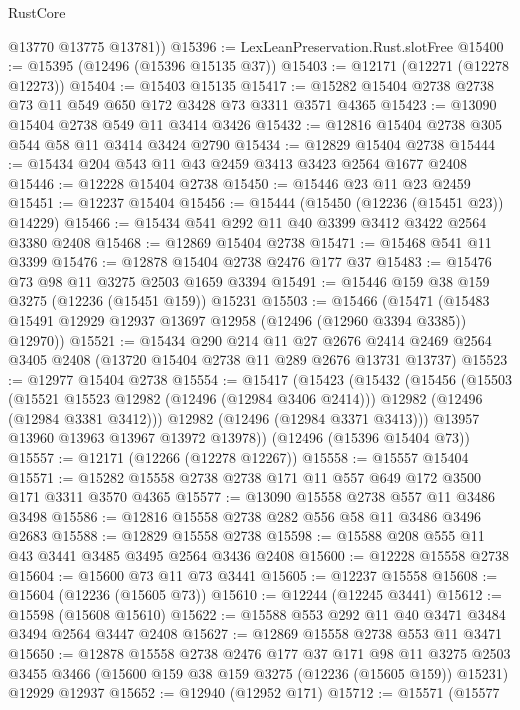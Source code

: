 \begin{lexlean}{RustCore}
\begin{coremodule}
        @13770
        @13775
        @13781))
@15396 := LexLeanPreservation.Rust.slotFree
@15400 := @15395 (@12496 (@15396 @15135 @37))
@15403 := @12171 (@12271 (@12278 @12273))
@15404 := @15403 @15135
@15417 := @15282 @15404 @2738 @2738 @73 @11 @549 @650 @172 @3428 @73 @3311 @3571 @4365
@15423 := @13090 @15404 @2738 @549 @11 @3414 @3426
@15432 := @12816 @15404 @2738 @305 @544 @58 @11 @3414 @3424 @2790
@15434 := @12829 @15404 @2738
@15444 := @15434 @204 @543 @11 @43 @2459 @3413 @3423 @2564 @1677 @2408
@15446 := @12228 @15404 @2738
@15450 := @15446 @23 @11 @23 @2459
@15451 := @12237 @15404
@15456 := @15444 (@15450 (@12236 (@15451 @23)) @14229)
@15466 := @15434 @541 @292 @11 @40 @3399 @3412 @3422 @2564 @3380 @2408
@15468 := @12869 @15404 @2738
@15471 := @15468 @541 @11 @3399
@15476 := @12878 @15404 @2738 @2476 @177 @37
@15483 := @15476 @73 @98 @11 @3275 @2503 @1659 @3394
@15491 := @15446 @159 @38 @159 @3275 (@12236 (@15451 @159)) @15231
@15503 := @15466
    (@15471 (@15483 @15491 @12929 @12937 @13697 @12958 (@12496 (@12960 @3394 @3385)) @12970))
@15521 := @15434
    @290
    @214
    @11
    @27
    @2676
    @2414
    @2469
    @2564
    @3405
    @2408
    (@13720 @15404 @2738 @11 @289 @2676 @13731 @13737)
@15523 := @12977 @15404 @2738
@15554 := @15417
    (@15423
      (@15432
        (@15456
          (@15503
            (@15521 @15523 @12982 (@12496 (@12984 @3406 @2414)))
            @12982
            (@12496 (@12984 @3381 @3412)))
          @12982
          (@12496 (@12984 @3371 @3413)))
        @13957
        @13960
        @13963
        @13967
        @13972
        @13978))
    (@12496 (@15396 @15404 @73))
@15557 := @12171 (@12266 (@12278 @12267))
@15558 := @15557 @15404
@15571 := @15282 @15558 @2738 @2738 @171 @11 @557 @649 @172 @3500 @171 @3311 @3570 @4365
@15577 := @13090 @15558 @2738 @557 @11 @3486 @3498
@15586 := @12816 @15558 @2738 @282 @556 @58 @11 @3486 @3496 @2683
@15588 := @12829 @15558 @2738
@15598 := @15588 @208 @555 @11 @43 @3441 @3485 @3495 @2564 @3436 @2408
@15600 := @12228 @15558 @2738
@15604 := @15600 @73 @11 @73 @3441
@15605 := @12237 @15558
@15608 := @15604 (@12236 (@15605 @73))
@15610 := @12244 (@12245 @3441)
@15612 := @15598 (@15608 @15610)
@15622 := @15588 @553 @292 @11 @40 @3471 @3484 @3494 @2564 @3447 @2408
@15627 := @12869 @15558 @2738 @553 @11 @3471
@15650 := @12878
    @15558
    @2738
    @2476
    @177
    @37
    @171
    @98
    @11
    @3275
    @2503
    @3455
    @3466
    (@15600 @159 @38 @159 @3275 (@12236 (@15605 @159)) @15231)
    @12929
    @12937
@15652 := @12940 (@12952 @171)
@15712 := @15571
    (@15577

\end{coremodule}
\end{lexlean}
